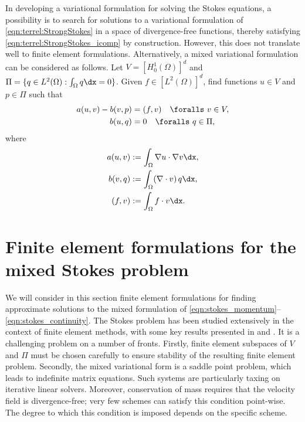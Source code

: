 In developing a variational formulation for solving the Stokes equations,
a possibility is to search for solutions to a variational formulation of
\eqref{eqn:terrel:StrongStokes} in a space of divergence-free functions,
thereby satisfying \eqref{eqn:terrel:StrongStokes_icomp} by construction.
However, this does not translate well to finite element
formulations. Alternatively, a mixed variational formulation can be
considered as follows. Let $V = [H^{1}_{0}(\Omega)]^d$ and $\Pi = \{q \in
L^2(\Omega) : \int_\Omega q \dx = 0\}$.  Given $f \in [L^{2}(\Omega)]^d$,
find functions $u \in V$ and $p \in \Pi$ such that\vspace*{-2.5pt}
%
\begin{align}
    a(u, v) - b(v, p)  &=  (f, v) \quad \foralls \ v \in V,
\label{eqn:stokes_momentum}
\\
    b(u, q) &= 0 \quad \foralls \ q \in \Pi,
\label{eqn:stokes_continuity}\vspace*{-2.5pt}
\end{align}
%
where\vspace*{-2.5pt}
%
\begin{align}
  a(u, v) &:= \int_\Omega \nabla{u} \cdot \nabla v \dx,
\\
  b(v, q) &:= \int_\Omega (\nabla\cdot v) \, q \dx,
\\
  (f, v) &:= \int_\Omega f \cdot v \dx.
\end{align}
\section{Finite element formulations for the mixed Stokes problem}

We will consider in this section finite element formulations
for finding approximate solutions to the mixed formulation of
\eqref{eqn:stokes_momentum}--\eqref{eqn:stokes_continuity}.  The Stokes
problem has been studied extensively in the context of finite element
methods, with some key results presented in \citet{BrezziFortin1991}
and \citet{BrennerScott2008}.  It is a challenging problem on a number
of fronts.  Firstly, finite element subspaces of $V$ and $\Pi$ must be
chosen carefully to ensure stability of the resulting finite element
problem. Secondly, the mixed variational form is a saddle point problem,
which leads to indefinite matrix equations. Such systems are particularly
taxing on iterative linear solvers.  Moreover, conservation of mass
requires that the velocity field is divergence-free; very few schemes can
satisfy this condition point-wise.  The degree to which this condition
is imposed depends on the specific scheme.

